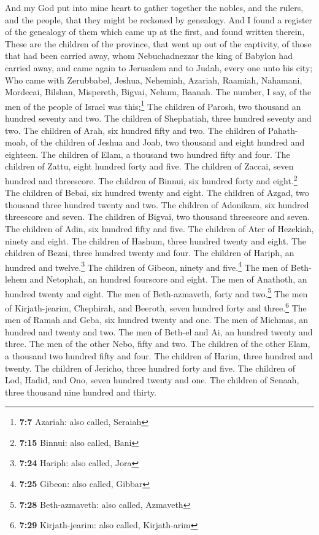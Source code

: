  And my God put into mine heart to gather together the
nobles, and the rulers, and the people, that they might be reckoned by
genealogy. And I found a register of the genealogy of them which came up
at the first, and found written therein,  These are the
children of the province, that went up out of the captivity, of those
that had been carried away, whom Nebuchadnezzar the king of Babylon had
carried away, and came again to Jerusalem and to Judah, every one unto
his city;  Who came with Zerubbabel, Jeshua, Nehemiah,
Azariah, Raamiah, Nahamani, Mordecai, Bilshan, Mispereth, Bigvai, Nehum,
Baanah. The number, I say, of the men of the people of Israel was
this;\footnote{\textbf{7:7} Azariah: also called, Seraiah}
 The children of Parosh, two thousand an hundred seventy
and two.  The children of Shephatiah, three hundred
seventy and two.  The children of Arah, six hundred fifty
and two.  The children of Pahath-moab, of the children of
Jeshua and Joab, two thousand and eight hundred and eighteen.
 The children of Elam, a thousand two hundred fifty and
four.  The children of Zattu, eight hundred forty and
five.  The children of Zaccai, seven hundred and
threescore.  The children of Binnui, six hundred forty
and eight.\footnote{\textbf{7:15} Binnui: also called, Bani}
 The children of Bebai, six hundred twenty and eight.
 The children of Azgad, two thousand three hundred twenty
and two.  The children of Adonikam, six hundred
threescore and seven.  The children of Bigvai, two
thousand threescore and seven.  The children of Adin, six
hundred fifty and five.  The children of Ater of
Hezekiah, ninety and eight.  The children of Hashum,
three hundred twenty and eight.  The children of Bezai,
three hundred twenty and four.  The children of Hariph,
an hundred and twelve.\footnote{\textbf{7:24} Hariph: also called, Jora}
 The children of Gibeon, ninety and five.\footnote{\textbf{7:25}
  Gibeon: also called, Gibbar}  The men of Beth-lehem and
Netophah, an hundred fourscore and eight.  The men of
Anathoth, an hundred twenty and eight.  The men of
Beth-azmaveth, forty and two.\footnote{\textbf{7:28} Beth-azmaveth: also
  called, Azmaveth}  The men of Kirjath-jearim,
Chephirah, and Beeroth, seven hundred forty and three.\footnote{\textbf{7:29}
  Kirjath-jearim: also called, Kirjath-arim}  The men of
Ramah and Geba, six hundred twenty and one.  The men of
Michmas, an hundred and twenty and two.  The men of
Beth-el and Ai, an hundred twenty and three.  The men of
the other Nebo, fifty and two.  The children of the other
Elam, a thousand two hundred fifty and four.  The
children of Harim, three hundred and twenty.  The
children of Jericho, three hundred forty and five.  The
children of Lod, Hadid, and Ono, seven hundred twenty and one.
 The children of Senaah, three thousand nine hundred and
thirty.

